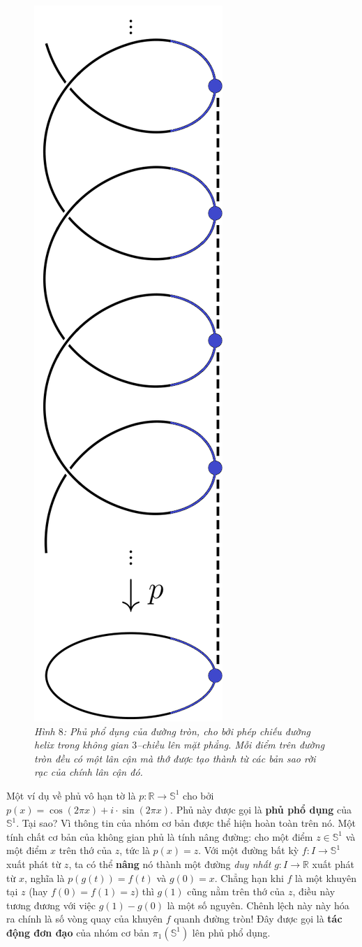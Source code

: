 \begin{multicols}{2}
		\begin{figure}[H]
		\vspace*{-5pt}
		\centering
		\captionsetup{labelformat= empty, justification=centering}
		\includegraphics[width= 0.2\linewidth]{h8.png}
		\caption{\small\textit{\color{duongvaotoanhoc}Hình $8$: Phủ phổ dụng của đường tròn, cho bởi phép chiếu đường helix trong không gian $3$--chiều lên mặt phẳng. Mỗi điểm trên đường tròn đều có một lân cận mà thớ được tạo thành từ các bản sao rời rạc của chính lân cận đó.}}
		\vspace*{-5pt}
	\end{figure}
	Một ví dụ về phủ vô hạn tờ là $p: \mathbb{R} \to \mathbb{S}^1$ cho bởi $p(x) = \cos(2\pi x)+i \cdot \sin(2\pi x)$. Phủ này được gọi là {\bf\color{duongvaotoanhoc} phủ phổ dụng} của $\mathbb{S}^1$. Tại sao? Vì thông tin của nhóm cơ bản được thể hiện hoàn toàn trên nó. Một tính chất cơ bản của không gian phủ là tính nâng đường: cho một điểm $z \in \mathbb{S}^1$ và một điểm $x$ trên thớ của $z$, tức là $p(x) = z$. Với một đường bất kỳ $f: I \to \mathbb{S}^1$ xuất phát từ $z$, ta có thể {\bf\color{duongvaotoanhoc} nâng} nó thành một đường {\it duy nhất} $g: I \to \mathbb{R}$ xuất phát từ $x$, nghĩa là $p(g(t)) = f(t)$ và $g(0) = x$. Chẳng hạn khi $f$ là một khuyên tại $z$ (hay $f(0) = f(1) = z$) thì $g(1)$ cũng nằm trên thớ của $z$, điều này tương đương với việc $g(1) - g(0)$ là một số nguyên. Chênh lệch này này hóa ra chính là số vòng quay của khuyên $f$ quanh đường tròn! Đây được gọi là {\bf\color{duongvaotoanhoc} tác động đơn đạo} của nhóm cơ bản $\pi_1(\mathbb{S}^1)$ lên phủ phổ dụng.
	\begin{figure}[H]

\end{figure}
\end{multicols}
